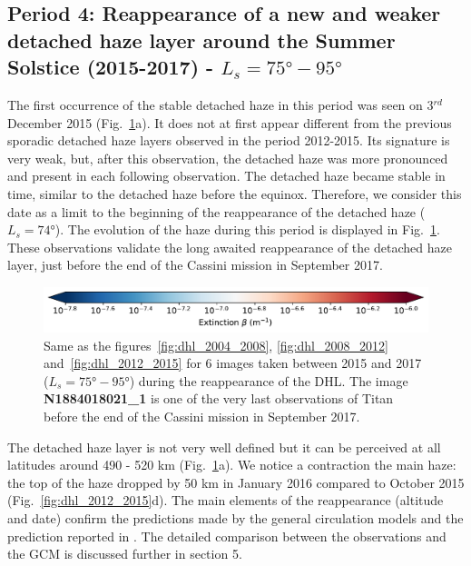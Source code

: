 \subsection{Period 4: Reappearance of a new and weaker detached haze layer around the Summer Solstice (2015-2017) - $L_s=\ang{75}-\ang{95}$}

The first occurrence of the stable detached haze in this period was seen on 3$^{rd}$ December 2015
(Fig.~\ref{fig:dhl_2015_2017}a). It
does not at first appear different from the previous sporadic detached haze layers observed in the period 2012-2015. Its signature is very weak, but, after
this observation, the detached haze was more pronounced and present in each following observation. The detached haze became stable in time,
similar to the detached haze before the equinox. Therefore, we consider this date as a limit to the beginning of the
reappearance of the detached haze ($L_s=\ang{74}$). The evolution of the haze during this period is displayed in
Fig.~\ref{fig:dhl_2015_2017}. These observations validate the long awaited reappearance of the detached haze layer,
just before the end of the Cassini mission in September 2017.

\begin{figure}[!ht]
\includegraphics[width=.5\textwidth]{Fig/Extinction_colorbar}
\caption{Same as the figures~\ref{fig:dhl_2004_2008}, \ref{fig:dhl_2008_2012}
and~\ref{fig:dhl_2012_2015} for 6 images taken between 2015 and 2017
($L_s=\ang{75}-\ang{95}$) during the reappearance of the DHL.
The image \textbf{N1884018021\_1} is one of the very last observations of Titan before
the end of the Cassini mission in September 2017.}
\label{fig:dhl_2015_2017}
\end{figure}

The detached haze layer is not very well defined but it can be perceived at all latitudes
around 490 - 520 km (Fig.~\ref{fig:dhl_2015_2017}a). We notice a contraction
the main haze: the top of the haze dropped by 50 km in January 2016 compared to October 2015
(Fig.~\ref{fig:dhl_2012_2015}d). The main elements of the reappearance (altitude and date) confirm the
predictions made by the general circulation models \citep{Lebonnois2012,Larson2015} and the prediction
reported in \cite{West2011}. The detailed comparison between the observations and the GCM is discussed further
in section 5.

